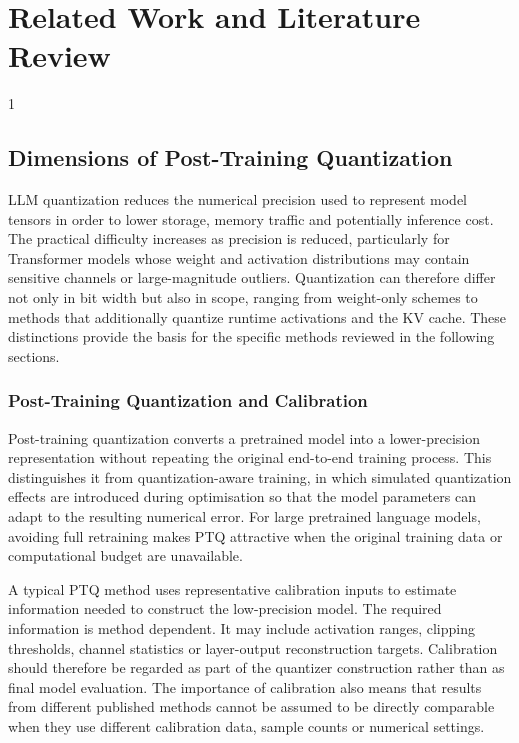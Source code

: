\doublespacing %

\chapter{Related Work and Literature Review}
\label{ch2}

\begin{spacing}{1} %
\minitoc %
\end{spacing} %
\thesisspacing %




\section{Dimensions of Post-Training Quantization}

LLM quantization reduces the numerical precision used to represent model tensors in order to lower storage, memory traffic and potentially inference cost. The practical difficulty increases as precision is reduced, particularly for Transformer models whose weight and activation distributions may contain sensitive channels or large-magnitude outliers. Quantization can therefore differ not only in bit width but also in scope, ranging from weight-only schemes to methods that additionally quantize runtime activations and the {KV} cache. These distinctions provide the basis for the specific methods reviewed in the following sections.


\subsection{Post-Training Quantization and Calibration}

Post-training quantization converts a pretrained model into a
lower-precision representation without repeating the original
end-to-end training process. This distinguishes it from
quantization-aware training, in which simulated quantization effects are
introduced during optimisation so that the model parameters can adapt to
the resulting numerical error.\cite{jacob2017quantizationtrainingneuralnetworks}
For large pretrained language models, avoiding full retraining makes
{PTQ} attractive when the original training data or computational
budget are unavailable.

A typical {PTQ} method uses representative calibration inputs to
estimate information needed to construct the low-precision model. The
required information is method dependent. It may include activation
ranges, clipping thresholds, channel statistics or layer-output
reconstruction targets. Calibration should therefore be regarded as part
of the quantizer construction rather than as final model evaluation.
The importance of calibration also means that results from different
published methods cannot be assumed to be directly comparable when they
use different calibration data, sample counts or numerical settings\cite{williams-aletras-2024-impact}.


